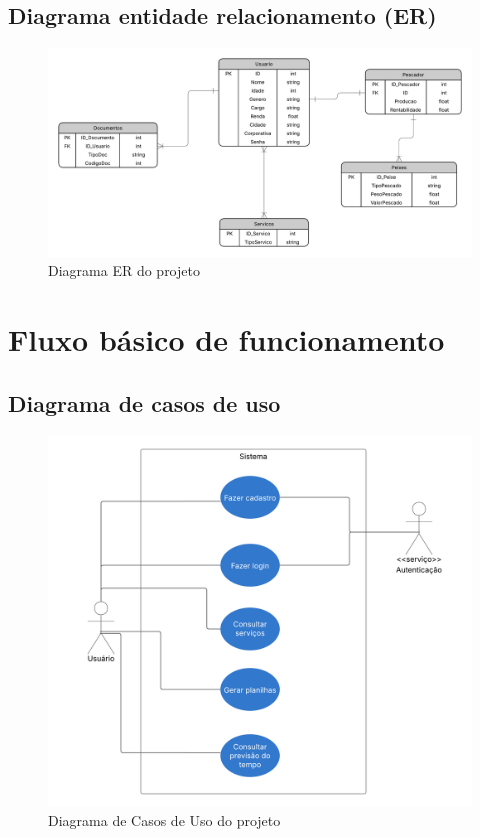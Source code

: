 \documentclass[a4paper]{abntex2}
\begin{document}
\subsection{Diagrama entidade relacionamento (ER)}

\begin{figure}[H]
    \centering
    \includegraphics[width=1\linewidth]{imagens/Diagrama ER de banco de dados.png}
    \caption{Diagrama ER do projeto}
    \label{fig:er-projeto}
\end{figure}

\section{Fluxo básico de funcionamento}

\subsection{Diagrama de casos de uso}

\begin{figure}[H]
    \centering
    \includegraphics[width=1\linewidth]{imagens/Caso de Uso POO DEV.png}
    \caption{Diagrama de Casos de Uso do projeto}
    \label{fig:casos-de-uso-projeto}
\end{figure}
\end{document}
